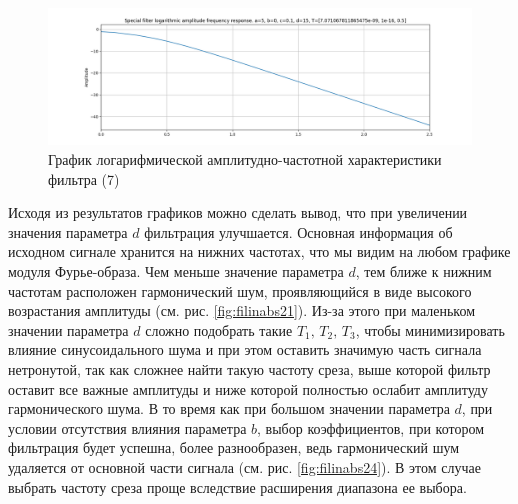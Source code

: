 \documentclass[a4paper, 12pt]{article}
\begin{document}
    \begin{figure}[H]
        \centering
        \includegraphics[scale=0.4]{7_fl2_lafr.png}
        \captionsetup{skip=0pt}
        \caption{График логарифмической амплитудно-частотной характеристики фильтра (7)}
        \label{fig:filinlafr27}
    \end{figure}


    Исходя из результатов графиков можно сделать вывод, что при увеличении значения параметра $d$ фильтрация
    улучшается. Основная информация об исходном сигнале хранится на нижних частотах, что мы видим на любом
    графике модуля Фурье-образа. Чем меньше значение параметра $d$, тем ближе к нижним частотам расположен
    гармонический шум, проявляющийся в виде высокого возрастания амплитуды (см. рис. \ref{fig:filinabs21}). Из-за этого при маленьком
    значении параметра $d$ сложно подобрать такие $T_1,\,T_2,\,T_3$, чтобы минимизировать влияние синусоидального
    шума и при этом оставить значимую часть сигнала нетронутой, так как сложнее найти такую частоту среза, выше которой
    фильтр оставит все важные амплитуды и ниже которой полностью ослабит амплитуду гармонического шума. В то время как
    при большом значении параметра $d$, при условии отсутствия влияния параметра $b$, выбор коэффициентов, при котором фильтрация
    будет успешна, более разнообразен, ведь гармонический шум удаляется от основной части сигнала (см. рис. \ref{fig:filinabs24}). В этом случае выбрать частоту среза проще вследствие
    расширения диапазона ее выбора.
    
\end{document}
